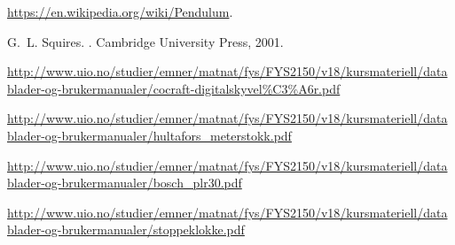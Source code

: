 \documentclass[11pt,a4paper]{article}
\begin{document}
\begin{thebibliography}{1}

\url{https://en.wikipedia.org/wiki/Pendulum}.

G.~L. Squires.
.
\newblock Cambridge University Press, 2001.

\url{http://www.uio.no/studier/emner/matnat/fys/FYS2150/v18/kursmateriell/datablader-og-brukermanualer/cocraft-digitalskyvel%C3%A6r.pdf}

\url{http://www.uio.no/studier/emner/matnat/fys/FYS2150/v18/kursmateriell/datablader-og-brukermanualer/hultafors_meterstokk.pdf}

\url{http://www.uio.no/studier/emner/matnat/fys/FYS2150/v18/kursmateriell/datablader-og-brukermanualer/bosch_plr30.pdf}

\url{http://www.uio.no/studier/emner/matnat/fys/FYS2150/v18/kursmateriell/datablader-og-brukermanualer/stoppeklokke.pdf}

\end{thebibliography}
\end{document}
